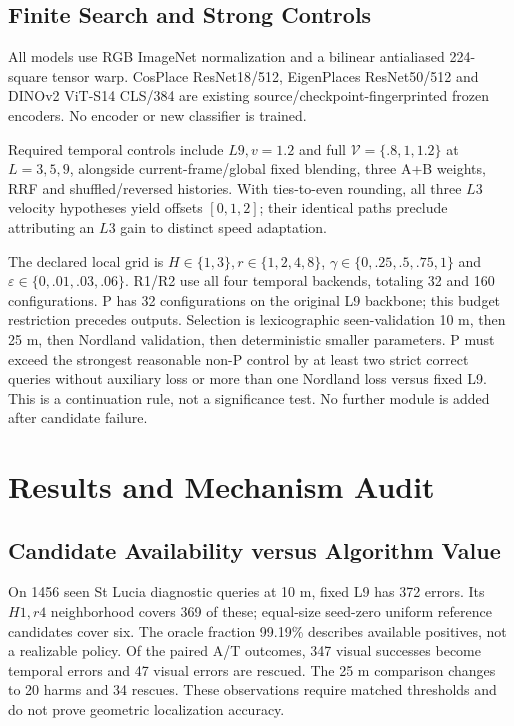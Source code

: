 \documentclass[conference]{IEEEtran}
\begin{document}
\subsection{Finite Search and Strong Controls}
All models use RGB ImageNet normalization and a bilinear antialiased 224-square tensor warp. CosPlace ResNet18/512, EigenPlaces ResNet50/512 and DINOv2 ViT-S14 CLS/384 are existing source/checkpoint-fingerprinted frozen encoders. No encoder or new classifier is trained.

Required temporal controls include $L9,v=1.2$ and full $\mathcal V=\{.8,1,1.2\}$ at $L=3,5,9$, alongside current-frame/global fixed blending, three A+B weights, RRF and shuffled/reversed histories. With ties-to-even rounding, all three $L3$ velocity hypotheses yield offsets $[0,1,2]$; their identical paths preclude attributing an $L3$ gain to distinct speed adaptation.

The declared local grid is $H\in\{1,3\},r\in\{1,2,4,8\}$, $\gamma\in\{0,.25,.5,.75,1\}$ and $\varepsilon\in\{0,.01,.03,.06\}$. R1/R2 use all four temporal backends, totaling 32 and 160 configurations. P has 32 configurations on the original L9 backbone; this budget restriction precedes outputs. Selection is lexicographic seen-validation 10 m, then 25 m, then Nordland validation, then deterministic smaller parameters. P must exceed the strongest reasonable non-P control by at least two strict correct queries without auxiliary loss or more than one Nordland loss versus fixed L9. This is a continuation rule, not a significance test. No further module is added after candidate failure.



\section{Results and Mechanism Audit}
\subsection{Candidate Availability versus Algorithm Value}
On 1456 seen St Lucia diagnostic queries at 10 m, fixed L9 has 372 errors. Its $H1,r4$ neighborhood covers 369 of these; equal-size seed-zero uniform reference candidates cover six. The oracle fraction 99.19\% describes available positives, not a realizable policy. Of the paired A/T outcomes, 347 visual successes become temporal errors and 47 visual errors are rescued. The 25 m comparison changes to 20 harms and 34 rescues. These observations require matched thresholds and do not prove geometric localization accuracy.
\end{document}
